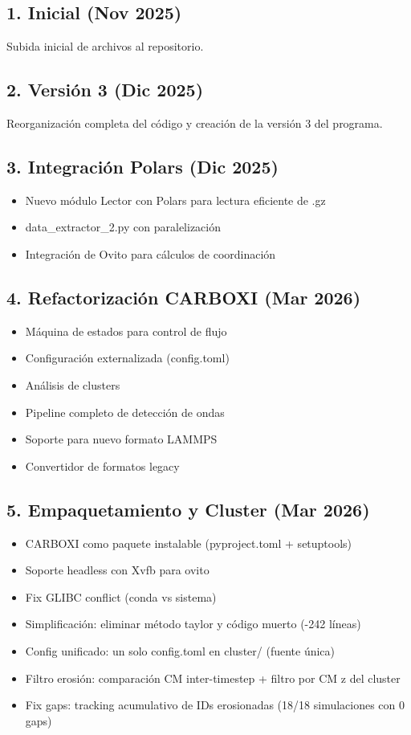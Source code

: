 \documentclass[12pt,a4paper]{article}
\begin{document}
\subsection*{1. Inicial (Nov 2025)}
Subida inicial de archivos al repositorio.

\subsection*{2. Versión 3 (Dic 2025)}
Reorganización completa del código y creación de la versión 3 del programa.

\subsection*{3. Integración Polars (Dic 2025)}
\begin{itemize}
	\item Nuevo módulo Lector con Polars para lectura eficiente de .gz
	\item data\_extractor\_2.py con paralelización
	\item Integración de Ovito para cálculos de coordinación
\end{itemize}

\subsection*{4. Refactorización CARBOXI (Mar 2026)}
\begin{itemize}
	\item Máquina de estados para control de flujo
	\item Configuración externalizada (config.toml)
	\item Análisis de clusters
	\item Pipeline completo de detección de ondas
	\item Soporte para nuevo formato LAMMPS
	\item Convertidor de formatos legacy
\end{itemize}

\subsection*{5. Empaquetamiento y Cluster (Mar 2026)}
\begin{itemize}
	\item CARBOXI como paquete instalable (pyproject.toml + setuptools)
	\item Soporte headless con Xvfb para ovito
	\item Fix GLIBC conflict (conda vs sistema)
	\item Simplificación: eliminar método taylor y código muerto (-242 líneas)
	\item Config unificado: un solo config.toml en cluster/ (fuente única)
	\item Filtro erosión: comparación CM inter-timestep + filtro por CM z del cluster
	\item Fix gaps: tracking acumulativo de IDs erosionadas (18/18 simulaciones con 0 gaps)
\end{itemize}
\end{document}
